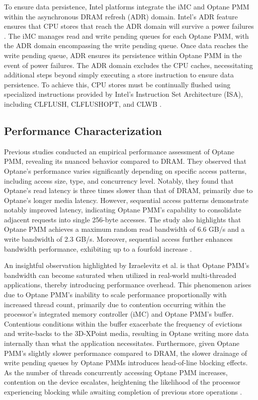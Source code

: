 To ensure data persistence, Intel platforms integrate the iMC and Optane PMM within the asynchronous DRAM refresh (ADR) domain. Intel's ADR feature ensures that CPU stores that reach the ADR domain will survive a power failures \cite{yang2020empirical}. The iMC manages read and write pending queues for each Optane PMM, with the ADR domain encompassing the write pending queue. Once data reaches the write pending queue, ADR ensures its persistence within Optane PMM in the event of power failures. The ADR domain excludes the CPU caches, necessitating additional steps beyond simply executing a store instruction to ensure data persistence. To achieve this, CPU stores must be continually flushed using specialized instructions provided by Intel's Instruction Set Architecture (ISA), including \textrm{CLFLUSH}, \textrm{CLFLUSHOPT}, and \textrm{CLWB} \cite{yang2020empirical,izraelevitz2019basic,rudoff2017persistent}.

\subsection{Performance Characterization}
Previous studies \cite{yang2020empirical,izraelevitz2019basic} conducted an empirical performance assessment of Optane PMM, revealing its nuanced behavior compared to DRAM. They observed that Optane's performance varies significantly depending on specific access patterns, including access size, type, and concurrency level. Notably, they found that Optane's read latency is three times slower than that of DRAM, primarily due to Optane's longer media latency. However, sequential access patterns demonstrate notably improved latency, indicating Optane PMM's capability to consolidate adjacent requests into single 256-byte accesses. The study also highlights that Optane PMM achieves a maximum random read bandwidth of 6.6 GB/s and a write bandwidth of 2.3 GB/s. Moreover, sequential access further enhances bandwidth performance, exhibiting up to a fourfold increase \cite{yang2020empirical,izraelevitz2019basic}.

An insightful observation highlighted by Izraelevitz et al. \cite{izraelevitz2019basic} is that Optane PMM's bandwidth can become saturated when utilized in real-world multi-threaded applications, thereby introducing performance overhead. This phenomenon arises due to Optane PMM's inability to scale performance proportionally with increased thread count, primarily due to contention occurring within the processor's integrated memory controller (iMC) and Optane PMM's buffer. Contentious conditions within the buffer exacerbate the frequency of evictions and write-backs to the 3D-XPoint media, resulting in Optane writing more data internally than what the application necessitates. Furthermore, given Optane PMM's slightly slower performance compared to DRAM, the slower drainage of write pending queues by Optane PMMs introduces head-of-line blocking effects. As the number of threads concurrently accessing Optane PMM increases, contention on the device escalates, heightening the likelihood of the processor experiencing blocking while awaiting completion of previous store operations \cite{yang2020empirical}.


